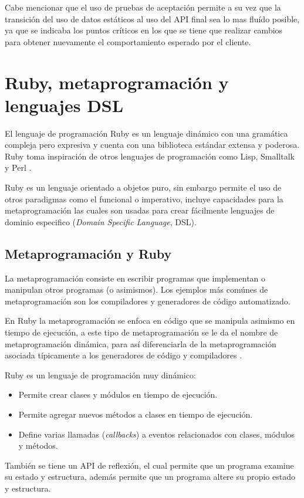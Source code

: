 Cabe mencionar que el uso de pruebas de aceptación permite a su vez que la
transición del uso de datos estáticos al uso del API final sea lo mas fluído
posible, ya que se indicaba los puntos críticos en los que se tiene que realizar
cambios para obtener nuevamente el comportamiento esperado por el cliente.

\section{Ruby, metaprogramación y lenguajes DSL}
El lenguaje de programación Ruby es un lenguaje dinámico con una gramática compleja
pero expresiva y cuenta con una biblioteca estándar extensa y poderosa.
Ruby toma inspiración de otros lenguajes de programación como Lisp, Smalltalk y Perl
\cite{24_matsumoto_2008}.

Ruby es un lenguaje orientado a objetos puro, sin embargo permite el uso de
otros paradigmas como el funcional o imperativo, incluye capacidades para la
metaprogramación las cuales son usadas para crear fácilmente lenguajes de
dominio especifico (\textit{Domain Specific Language}, DSL)\cite{24_matsumoto_2008}.

\subsection{Metaprogramación y Ruby}
La metaprogramación consiste en escribir programas que implementan o manipulan otros
programas (o asimismos). Los ejemplos más comúnes de metaprogramación son los
compiladores y generadores de código automatizado.

En Ruby la metaprogramación se enfoca en código que se manipula asimismo en tiempo
de ejecución, a este tipo de metaprogramación se le da el nombre de metaprogramación
dinámica, para así diferenciarla de la metaprogramación asociada típicamente a
los generadores de código y compiladores \cite{2_perrotta_2010}.

Ruby es un lenguaje de programación muy dinámico:
\begin{itemize}
\item Permite crear clases y módulos en tiempo de ejecución.
\item Permite agregar nuevos métodos a clases en tiempo de ejecución.
\item Define varias llamadas (\textit{callbacks}) a eventos relacionados con
  clases, módulos y métodos.
\end{itemize}

También se tiene un API de reflexión, el cual permite que un programa examine
su estado y estructura, además permite que un programa altere su propio estado
y estructura.

